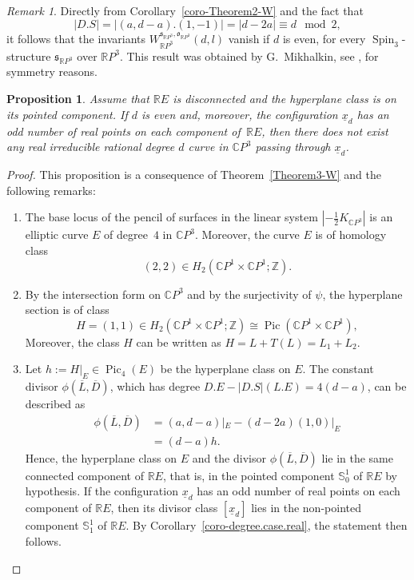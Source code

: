 \documentclass[11pt]{amsart}
\numberwithin{equation}{section}
\theoremstyle{definition}
\theoremstyle{plain}
\newtheorem{proposition}[definition]{Proposition}
\theoremstyle{remark}
\newtheorem{remark}[definition]{Remark}
\newcommand{\R}{\mathbb{R}}
\newcommand{\Z}{\mathbb{Z}}
\newcommand{\C}{\mathbb{C}}
\DeclareMathOperator{\Pic}{Pic}
\DeclareMathOperator{\Spin}{Spin}
\begin{document}
\begin{remark}
Directly from Corollary~\ref{coro-Theorem2-W} and the fact that $$|D.S|=|(a,d-a).(1,-1)|=| d-2a|\equiv d\mod 2,$$
it follows that the invariants $ W_{\R P^3}^{\mathfrak{s}_{\R P^3},\mathfrak{o}_{\R P^3}}(d,l)$ vanish if $d$ is even, for every $\Spin_3$-structure $\mathfrak{s}_{\R P^3}$ over $\R P^3$. This result was obtained by G.~Mikhalkin, see \cite{brugalle2007enumeration}, for symmetry reasons. 
\end{remark}

\begin{proposition} \label{prop-application.deg8}
Assume that $\R E$ is disconnected and the hyperplane class is on its pointed component. If $d$ is even and, moreover, the configuration $\underline{x}_d$ has an odd number of real points on each component of\, $\R E$, then there does not exist any real irreducible rational degree $d$ curve in  $\C P^3$ passing through $\underline{x}_d$. 
\end{proposition}

\begin{proof}
This proposition is a consequence of Theorem~\ref{Theorem3-W}     and the following remarks: 
    \begin{enumerate}
      \item The base locus of the pencil of surfaces in the linear system $|-\frac{1}{2}K_{\C P^3}|$ is an elliptic curve $E$ of degree~$4$ in $\C P^3$. Moreover, the curve $E$ is of homology class 
        $$(2,2)\in  H_2(\C P^1\times \C P^1;\Z).$$
        \item By the intersection form on $\C P^3$ and by the surjectivity of $\psi$, the hyperplane section is of class $$H=(1,1) \in H_2(\C P^1\times \C P^1;\Z) \cong \Pic(\C P^1\times \C P^1),$$ Moreover, the class $H$ can be written as $H=L+T(L)=L_1+L_2$.
        \item  Let $h:=H|_E \in \Pic_4(E)$ be the hyperplane class on $E$. The constant divisor $ \phi(\overline{L},\overline{D})$, which has degree $D.E-|D.S|(L.E)=4(d-a)$,  can be described as
        \begin{align*}
            \phi(\overline{L},\overline{D})&=(a,d-a)|_E-(d-2a) (1,0)|_E\\
            &=(d-a)h.
        \end{align*}
         Hence, the hyperplane class on $E$ and the divisor         $\phi(\overline{L},\overline{D})$ lie in the same connected component of $\R E$, that is, in the pointed component $\mathbb{S}^1_0$ of  $\R E$ by hypothesis.         If the configuration $\underline{x}_d$ has an odd number of real points on each component of $\R E$, then its divisor class $[\underline{x}_d]$ lies in the non-pointed component $\mathbb{S}^1_1$ of $\R E$. By  Corollary~\ref{coro-degree.case.real}, the statement then follows.\qedhere  
               \end{enumerate} 
\end{proof}
\end{document}
